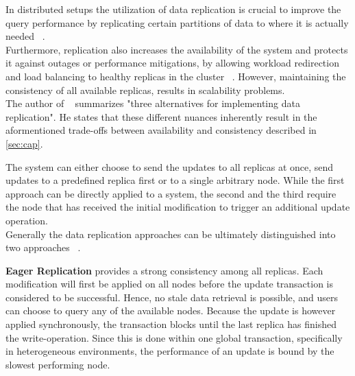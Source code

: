 In distributed setups the utilization of data replication is crucial to improve the query performance
by replicating certain partitions of data to where it is actually needed ~\cite{cloudpart_2012}.\\
Furthermore, replication also increases the availability of the system and protects it against outages or performance mitigations,
by allowing workload redirection and load balancing to healthy replicas in the cluster ~\cite{quorums:2003}.
However, maintaining the consistency of all available replicas, results in scalability problems.\\
The author of ~\cite{abadi2012} summarizes "three alternatives for implementing data replication".
He states that these different nuances inherently result in the aformentioned trade-offs between availability and consistency described in \ref{sec:cap}.

The system can either choose to send the updates to all replicas at once, send updates to a predefined replica first or to a single arbitrary node.
 While the first approach can be directly applied to a system, the second and the third require the node that has received the initial modification to trigger an additional update operation.
\\
Generally the data replication approaches can be ultimately distinguished into two approaches ~\cite{gray:1996}.

\textbf{Eager Replication} provides a strong consistency among all replicas. Each modification will first be applied on all nodes
before the update transaction is considered to be successful. Hence, no stale data retrieval is possible, and users can choose to query any of the available nodes.
Because the update is however applied synchronously, the transaction blocks until the last replica has finished the write-operation. 
Since this is done within one global transaction, specifically in heterogeneous environments, the performance of an update is bound by the slowest performing node.\\

